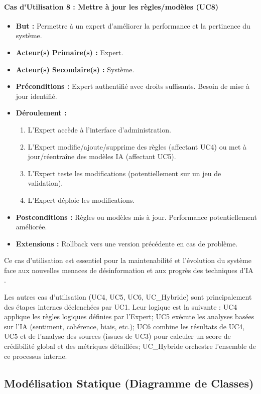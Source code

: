 \documentclass[9pt,twocolumn,french]{article}
\begin{document}
\paragraph{Cas d'Utilisation 8 : Mettre à jour les règles/modèles (UC8)}
\begin{itemize}
    \item \textbf{But :} Permettre à un expert d'améliorer la performance et la pertinence du système.
    \item \textbf{Acteur(s) Primaire(s) :} Expert.
    \item \textbf{Acteur(s) Secondaire(s) :} Système.
    \item \textbf{Préconditions :} Expert authentifié avec droits suffisants. Besoin de mise à jour identifié.
    \item \textbf{Déroulement  :}
        \begin{enumerate}
            \item L'Expert accède à l'interface d'administration.
            \item L'Expert modifie/ajoute/supprime des règles (affectant UC4) ou met à jour/réentraîne des modèles IA (affectant UC5).
            \item L'Expert teste les modifications (potentiellement sur un jeu de validation).
            \item L'Expert déploie les modifications.
        \end{enumerate}
    \item \textbf{Postconditions :} Règles ou modèles mis à jour. Performance potentiellement améliorée.
    \item \textbf{Extensions :} Rollback vers une version précédente en cas de problème.
\end{itemize}
Ce cas d'utilisation est essentiel pour la maintenabilité et l'évolution du système face aux nouvelles menaces de désinformation et aux progrès des techniques d'IA \citep{Nabozny2021, Loth2024, Zhou2022A}.

Les autres cas d'utilisation (UC4, UC5, UC6, UC\_Hybride) sont principalement des étapes internes déclenchées par UC1. Leur logique est la suivante : UC4 applique les règles logiques définies par l'Expert; UC5 exécute les analyses basées sur l'IA (sentiment, cohérence, biais, etc.); UC6 combine les résultats de UC4, UC5 et de l'analyse des sources (issues de UC3) pour calculer un score de crédibilité global et des métriques détaillées; UC\_Hybride orchestre l'ensemble de ce processus interne.

\subsection{Modélisation Statique (Diagramme de Classes)}
\end{document}
